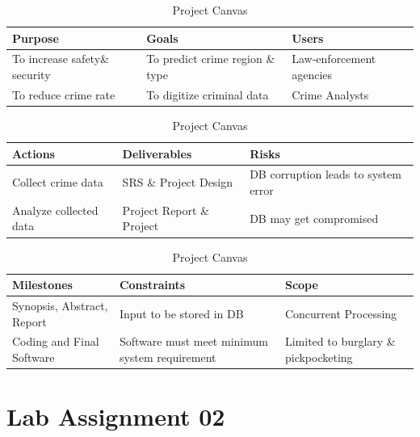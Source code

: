 \begin{table}[ht]
\caption{Project Canvas}
\begin{tabular}{ |p{5cm}|p{5cm}|p{5cm}|  }
 \hline
 \textbf{Purpose} & \textbf{Goals} & \textbf{Users}\\
 \hline
To increase safety\& security & To predict crime region \& type& Law-enforcement agencies\\

 
 To reduce crime rate & To digitize criminal data & Crime Analysts\\
 
 \hline

  

 
 \end{tabular}
 
\vspace{0.5cm} 
 
\begin{tabular}{ |p{5cm}|p{5cm}|p{5cm}|  }
 \hline
 \textbf{Actions} & \textbf{Deliverables} & \textbf{Risks} \\
 \hline
 Collect crime data & SRS \& Project Design & DB corruption leads to system error\\


  Analyze collected data & Project Report \& Project & DB may get compromised\\
   \hline
 
 \end{tabular}
 
\vspace{0.5cm} 

 \begin{tabular}{ |p{5cm}|p{5cm}|p{5cm}|  }
 \hline
 \textbf{Milestones} & \textbf{Constraints} & \textbf{Scope} \\
 \hline
 Synopsis, Abstract, Report & Input to be stored in DB & Concurrent Processing\\

  Coding and Final Software  & Software must meet minimum system requirement & Limited to burglary \& pickpocketing\\ 
   \hline
 
 \end{tabular}
  
 
\end{table} 



 
\newpage
\section*{\centering\LARGE{Lab Assignment 02}}

